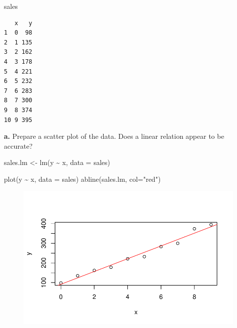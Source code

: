 \documentclass[
  letterpaper,
  DIV=11,
  numbers=noendperiod]{scrartcl}
\newenvironment{Shaded}{\begin{snugshade}}{\end{snugshade}}
\newcommand{\AttributeTok}[1]{\textcolor[rgb]{0.40,0.45,0.13}{#1}}
\newcommand{\FunctionTok}[1]{\textcolor[rgb]{0.28,0.35,0.67}{#1}}
\newcommand{\NormalTok}[1]{\textcolor[rgb]{0.00,0.23,0.31}{#1}}
\newcommand{\OtherTok}[1]{\textcolor[rgb]{0.00,0.23,0.31}{#1}}
\newcommand{\SpecialCharTok}[1]{\textcolor[rgb]{0.37,0.37,0.37}{#1}}
\newcommand{\StringTok}[1]{\textcolor[rgb]{0.13,0.47,0.30}{#1}}
\begin{document}
\begin{Shaded}
\begin{Highlighting}[]
\NormalTok{sales}
\end{Highlighting}
\end{Shaded}

\begin{verbatim}
   x   y
1  0  98
2  1 135
3  2 162
4  3 178
5  4 221
6  5 232
7  6 283
8  7 300
9  8 374
10 9 395
\end{verbatim}

\textbf{a.} Prepare a scatter plot of the data. Does a linear relation
appear to be accurate?

\begin{Shaded}
\begin{Highlighting}[]
\NormalTok{sales.lm }\OtherTok{\textless{}{-}} \FunctionTok{lm}\NormalTok{(y }\SpecialCharTok{\textasciitilde{}}\NormalTok{ x, }\AttributeTok{data =}\NormalTok{ sales)}
\end{Highlighting}
\end{Shaded}

\begin{Shaded}
\begin{Highlighting}[]
\FunctionTok{plot}\NormalTok{(y }\SpecialCharTok{\textasciitilde{}}\NormalTok{ x, }\AttributeTok{data =}\NormalTok{ sales)}
\FunctionTok{abline}\NormalTok{(sales.lm, }\AttributeTok{col=}\StringTok{"red"}\NormalTok{)}
\end{Highlighting}
\end{Shaded}

\begin{figure}[H]

{\centering \includegraphics{sta9700_ch3_hw_files/figure-pdf/unnamed-chunk-22-1.pdf}

}

\end{figure}
\end{document}

